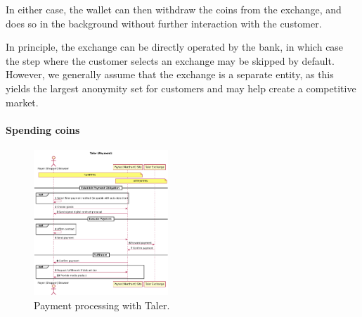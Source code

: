 \documentclass{IEEEtran}
\begin{document}
In either case, the wallet can then withdraw the coins from the
exchange, and does so in the background without further interaction
with the customer.

In principle, the exchange can be directly operated by the bank, in
which case the step where the customer selects an exchange may be
skipped by default.  However, we generally assume that the exchange is
a separate entity, as this yields the largest anonymity set for
customers and may help create a competitive market.

\paragraph{Spending coins}

\begin{figure}[b!]
\includegraphics[width=0.45\textwidth]{figs/taler-pay.pdf}
\caption{Payment processing with Taler.}
\label{fig:taler-pay}
\end{figure}
\end{document}
